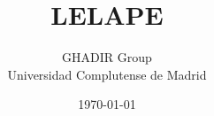 \documentclass[a4paper,11pt]{book}
\begin{document}
\author{GHADIR Group \\ Universidad Complutense de Madrid}
\title{\huge{LELAPE}}
\date{\today}

\frontmatter
\maketitle
\tableofcontents

\mainmatter





\backmatter
\end{document}
